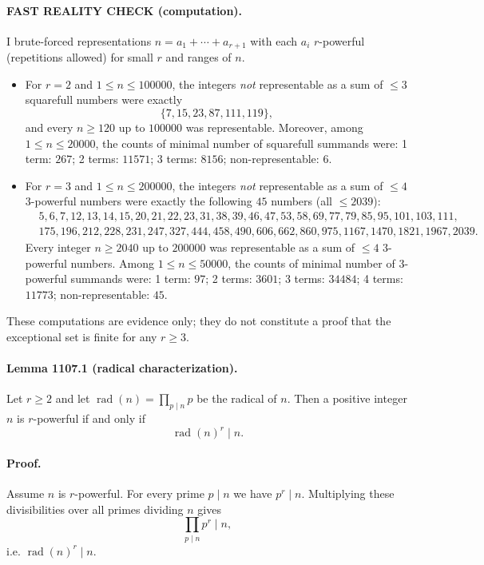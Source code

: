 \paragraph{FAST REALITY CHECK (computation).}
I brute-forced representations $n=a_1+\cdots+a_{r+1}$ with each $a_i$ $r$-powerful (repetitions allowed) for small $r$ and ranges of $n$.

\begin{itemize}
\item For $r=2$ and $1\le n\le 100000$, the integers \emph{not} representable as a sum of $\le 3$ squarefull numbers were exactly
\[\{7,15,23,87,111,119\},\]
and every $n\ge 120$ up to $100000$ was representable.
Moreover, among $1\le n\le 20000$, the counts of minimal number of squarefull summands were:
1 term: $267$; 2 terms: $11571$; 3 terms: $8156$; non-representable: $6$.

\item For $r=3$ and $1\le n\le 200000$, the integers \emph{not} representable as a sum of $\le 4$ $3$-powerful numbers were exactly the following $45$ numbers (all $\le 2039$):
\[\begin{aligned}
&5,6,7,12,13,14,15,20,21,22,23,31,38,39,46,47,53,58,69,77,79,85,95,101,103,111,\\
&175,196,212,228,231,247,327,444,458,490,606,662,860,975,1167,1470,1821,1967,2039.
\end{aligned}\]
Every integer $n\ge 2040$ up to $200000$ was representable as a sum of $\le 4$ $3$-powerful numbers.
Among $1\le n\le 50000$, the counts of minimal number of $3$-powerful summands were:
1 term: $97$; 2 terms: $3601$; 3 terms: $34484$; 4 terms: $11773$; non-representable: $45$.
\end{itemize}

These computations are evidence only; they do not constitute a proof that the exceptional set is finite for any $r\ge 3$.

\paragraph{Lemma 1107.1 (radical characterization).}
Let $r\ge 2$ and let $\operatorname{rad}(n)=\prod_{p\mid n} p$ be the radical of $n$. Then a positive integer $n$ is $r$-powerful if and only if
\[\operatorname{rad}(n)^r\mid n.\]

\paragraph{Proof.}
Assume $n$ is $r$-powerful. For every prime $p\mid n$ we have $p^r\mid n$. Multiplying these divisibilities over all primes dividing $n$ gives
\[\prod_{p\mid n} p^r\mid n,\]
i.e. $\operatorname{rad}(n)^r\mid n$.

